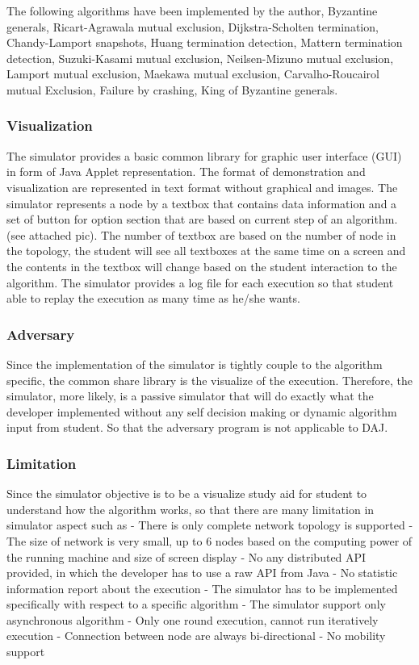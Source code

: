 The following algorithms have been implemented by the author,  Byzantine generals, Ricart-Agrawala mutual exclusion, Dijkstra-Scholten termination, Chandy-Lamport snapshots, Huang termination detection, Mattern termination detection, Suzuki-Kasami mutual exclusion, Neilsen-Mizuno mutual exclusion, Lamport mutual exclusion, Maekawa mutual exclusion, Carvalho-Roucairol mutual Exclusion, Failure by crashing, King of Byzantine generals.

\subsubsection{Visualization}
The simulator provides a basic common library for graphic user interface (GUI) in form of Java Applet representation. The format of demonstration and visualization are represented in text format without graphical and images. The simulator represents a node by a textbox that contains data information and a set of button for option section that are based on current step of an algorithm. (see attached pic). The number of textbox are based on the number of node in the topology, the student will see all textboxes at the same time on a screen and the contents in the textbox will change based on the student interaction to the algorithm. The simulator provides a log file for each execution so that student able to replay the execution as many time as he/she wants.

\subsubsection{Adversary}
Since the implementation of the simulator is tightly couple to the algorithm specific, the common share library is the visualize of the execution. Therefore, the simulator, more likely, is a passive simulator that will do exactly what the developer implemented without any self decision making or dynamic algorithm input from student. So that the adversary program is not applicable to DAJ.

\subsubsection{Limitation}
Since the simulator objective is to be a visualize study aid for student to understand how the algorithm works, so that there are many limitation in simulator aspect such as
- There is only complete network topology is supported
- The size of network is very small, up to 6 nodes based on the computing power of the running machine and size of screen display
- No any distributed API provided, in which the developer has to use a raw API from Java
- No statistic information report about the execution
- The simulator has to be implemented specifically with respect to a specific algorithm
- The simulator support only asynchronous algorithm
- Only one round execution, cannot run iteratively execution
- Connection between node are always bi-directional
- No mobility support

